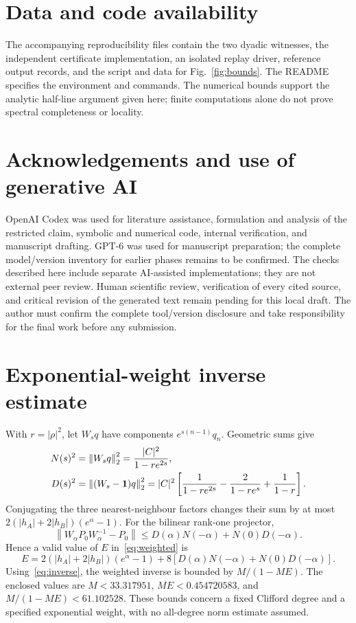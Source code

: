 \documentclass[11pt,a4paper]{article}
\newcommand{\Id}{\mathbf{1}}
\newcommand{\norm}[1]{\left\lVert#1\right\rVert}
\begin{document}
\section*{Data and code availability}
The accompanying reproducibility files contain the two dyadic witnesses,
the independent certificate implementation, an isolated replay driver,
reference output records, and the script and data for
Fig.~\ref{fig:bounds}. The README specifies the environment and commands.
The numerical bounds support the analytic half-line argument given here;
finite computations alone do not prove spectral completeness or locality.

\section*{Acknowledgements and use of generative AI}
OpenAI Codex was used for literature assistance, formulation and analysis
of the restricted claim, symbolic and numerical code, internal verification,
and manuscript drafting. GPT-6 was used for manuscript preparation; the
complete model/version inventory for earlier phases remains to be confirmed.
The checks described here include separate AI-assisted implementations;
they are not external peer review.
Human scientific review, verification of every cited source, and critical
revision of the generated text remain pending for this local draft.
The author must confirm the complete tool/version disclosure and take
responsibility for the final work before any submission.

\appendix
\section{Exponential-weight inverse estimate}\label{app:weight}
With $r=|\rho|^2$, let $W_s q$ have components $e^{s(n-1)}q_n$.
Geometric sums give
\begin{align}
 N(s)^2&=\norm{W_sq}_2^2=\frac{|C|^2}{1-re^{2s}},\notag\\
 D(s)^2&=\norm{(W_s-\Id)q}_2^2
 =|C|^2\left[\frac1{1-re^{2s}}-\frac2{1-re^s}+\frac1{1-r}\right].
 \label{eq:geometric}
\end{align}
Conjugating the three nearest-neighbour factors changes their sum by at most
$2(|h_A|+2|h_B|)(e^\alpha-1)$. For the bilinear rank-one projector,
\begin{equation}
 \norm{W_\alpha P_0W_\alpha^{-1}-P_0}
 \leq D(\alpha)N(-\alpha)+N(0)D(-\alpha).
\end{equation}
Hence a valid value of $E$ in~\eqref{eq:weighted} is
\begin{equation}
 E=2(|h_A|+2|h_B|)(e^\alpha-1)
       +8[D(\alpha)N(-\alpha)+N(0)D(-\alpha)].
\end{equation}
Using~\eqref{eq:inverse}, the weighted inverse is bounded by $M/(1-ME)$.
The enclosed values are $M<33.317951$, $ME<0.454720583$, and
$M/(1-ME)<61.102528$. These bounds concern a fixed Clifford degree and a
specified exponential weight, with no all-degree norm estimate assumed.
\end{document}
